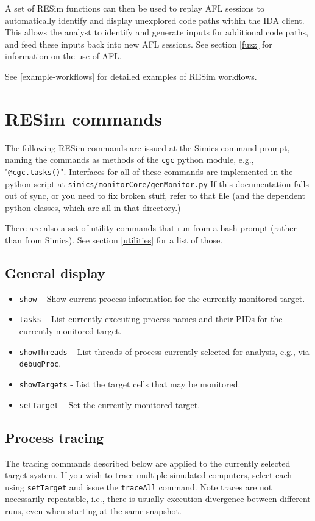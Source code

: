 \documentclass[titlepage]{article}
\begin{document}
A set of RESim functions can then be used to replay AFL sessions to automatically identify and display unexplored code paths within
the IDA client.  This allows the analyst to identify and generate inputs for additional code paths, and feed these inputs back into 
new AFL sessions.  See section \ref{fuzz} for information on the use of AFL.

See \ref{example-workflows} for detailed examples of RESim workflows.


\section{RESim commands}
\label{commands}
The following RESim commands are issued at the Simics command prompt, naming the commands as methods of the {\tt cgc} python module,
e.g., "{\tt @cgc.tasks()}".  Interfaces for all of these commands are implemented in the python script at {\tt simics/monitorCore/genMonitor.py}
If this documentation falls out of sync, or you need to fix broken stuff, refer to that file (and the dependent python classes, which are all in that directory.)

There are also a set of utility commands that run from a bash prompt (rather than from Simics).  See section \ref{utilities} for a list of those.

\label{commands}
\subsection{General display}
\begin{itemize}
\item {\tt show} -- Show current process information for the currently monitored target.
\item {\tt tasks} -- List currently executing process names and their PIDs for the currently monitored target.
\item {\tt showThreads} -- List threads of process currently selected for analysis, e.g., via {\tt debugProc}.
\item {\tt showTargets} - List the target cells that may be monitored.
\item {\tt setTarget} -- Set the currently monitored target.
\end{itemize}

\subsection{Process tracing}
\label{process_tracing}
The tracing commands described below are applied to the currently selected target system.  If you wish to trace multiple simulated computers, select
each using {\tt setTarget} and issue the {\tt traceAll} command.  Note traces are not necessarily repeatable, i.e., there is usually execution 
divergence between different runs, even when starting at the same snapshot.
\end{document}
